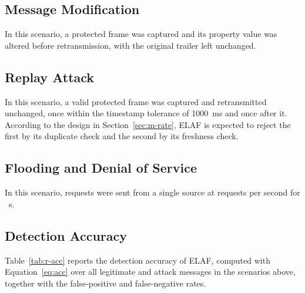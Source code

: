 \subsection{Message Modification}

In this scenario, a protected frame was captured and its property value was altered before retransmission, with the original trailer left unchanged.

\subsection{Replay Attack}

In this scenario, a valid protected frame was captured and retransmitted unchanged, once within the timestamp tolerance of 1000~ms and once after it. According to the design in Section~\ref{sec:m-rate}, ELAF is expected to reject the first by its duplicate check and the second by its freshness check.

\subsection{Flooding and Denial of Service}

In this scenario, requests were sent from a single source at \tbd{} requests per second for \tbd{}~s.

\subsection{Detection Accuracy}

Table~\ref{tab:r-acc} reports the detection accuracy of ELAF, computed with Equation~\ref{eq:acc} over all legitimate and attack messages in the scenarios above, together with the false-positive and false-negative rates.

